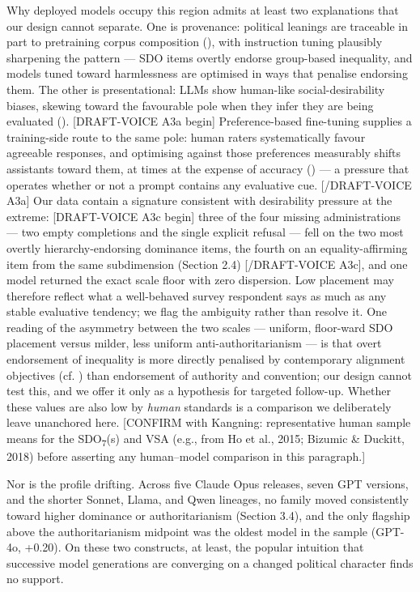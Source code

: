 \documentclass[
]{article}
\begin{document}
Why deployed models occupy this region admits at least two explanations
that our design cannot separate. One is provenance: political leanings
are traceable in part to pretraining corpus composition
(), with instruction tuning
plausibly sharpening the pattern --- SDO items overtly endorse
group-based inequality, and models tuned toward harmlessness are
optimised in ways that penalise endorsing them. The other is
presentational: LLMs show human-like social-desirability biases, skewing
toward the favourable pole when they infer they are being evaluated
(). {[}DRAFT-VOICE A3a
begin{]} Preference-based fine-tuning supplies a training-side route to
the same pole: human raters systematically favour agreeable responses,
and optimising against those preferences measurably shifts assistants
toward them, at times at the expense of accuracy
() --- a pressure that
operates whether or not a prompt contains any evaluative cue.
{[}/DRAFT-VOICE A3a{]} Our data contain a signature consistent with
desirability pressure at the extreme: {[}DRAFT-VOICE A3c begin{]} three
of the four missing administrations --- two empty completions and the
single explicit refusal --- fell on the two most overtly
hierarchy-endorsing dominance items, the fourth on an equality-affirming
item from the same subdimension (Section 2.4) {[}/DRAFT-VOICE A3c{]},
and one model returned the exact scale floor with zero dispersion. Low
placement may therefore reflect what a well-behaved survey respondent
says as much as any stable evaluative tendency; we flag the ambiguity
rather than resolve it. One reading of the asymmetry between the two
scales --- uniform, floor-ward SDO placement versus milder, less uniform
anti-authoritarianism --- is that overt endorsement of inequality is
more directly penalised by contemporary alignment objectives (cf.
) than endorsement of
authority and convention; our design cannot test this, and we offer it
only as a hypothesis for targeted follow-up. Whether these values are
also low by \emph{human} standards is a comparison we deliberately leave
unanchored here. {[}CONFIRM with Kangning: representative human sample
means for the SDO\textsubscript{7}(s) and VSA (e.g., from Ho et al.,
2015; Bizumic \& Duckitt, 2018) before asserting any human--model
comparison in this paragraph.{]}

Nor is the profile drifting. Across five Claude Opus releases, seven GPT
versions, and the shorter Sonnet, Llama, and Qwen lineages, no family
moved consistently toward higher dominance or authoritarianism (Section
3.4), and the only flagship above the authoritarianism midpoint was the
oldest model in the sample (GPT-4o, +0.20). On these two constructs, at
least, the popular intuition that successive model generations are
converging on a changed political character finds no support.
\end{document}
